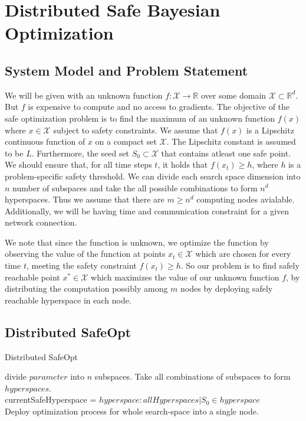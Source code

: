 \chapter{Distributed Safe Bayesian Optimization}
\label{ch:distbo}

\section{System Model and Problem Statement}
We will be given with an unknown function $f: \mathcal{X} \to \mathbb{R}$ over some domain $\mathcal{X} \subset \mathbb{R}^d$. But $f$ is expensive to compute and no access to gradients.
The objective of the safe optimization problem is to find the maximum of an unknown function $f(x)$ where $x \in \mathcal{X}$ subject to safety constraints. 
We assume that $f(x)$ is a Lipschitz continuous function of $x$ on a compact set $\mathcal{X}$. The Lipschitz constant is assumed to be $L$.
Furthermore, the seed set $S_0 \subset \mathcal{X}$ that contains atleast one safe point. 
We should ensure that, for all time steps $t$, it holds that $f(x_t) \geq h$, where $h$ is a problem-specific safety threshold.
We can divide each search space dimension into $n$ number of subspaces and take the all possible combinations to form $n^d$ hyperspaces. Thus we assume that there are $m \ge n^d$ computing nodes avialable. 
Additionally, we will be having time and communication constraint for a given network connection.

We note that since the function is unknown, we optimize the function by observing the value of the function at points $x_t \in \mathcal{X}$ which are chosen for every time $t$, meeting the safety constraint $f(x_t) \geq h$.
So our problem is to find safely reachable point $x^* \in \mathcal{X}$ which maximizes the value of our unknown function $f$, by distributing the computation possibly among $m$ nodes by deploying safely reachable hyperspace in each node.

\section{Distributed SafeOpt}


\begin{algorithm}
	\caption{Distributed SafeOpt}
	{
		divide $parameter$ into $n$ subspaces.
	}
	Take all combinations of subspaces to form $hyperspaces$.\\
	currentSafeHyperspace = $hyperspace : allHyperspaces | S_0 \in hyperspace$\\
	Deploy optimization process for whole search-space into a single node.
\end{algorithm}

